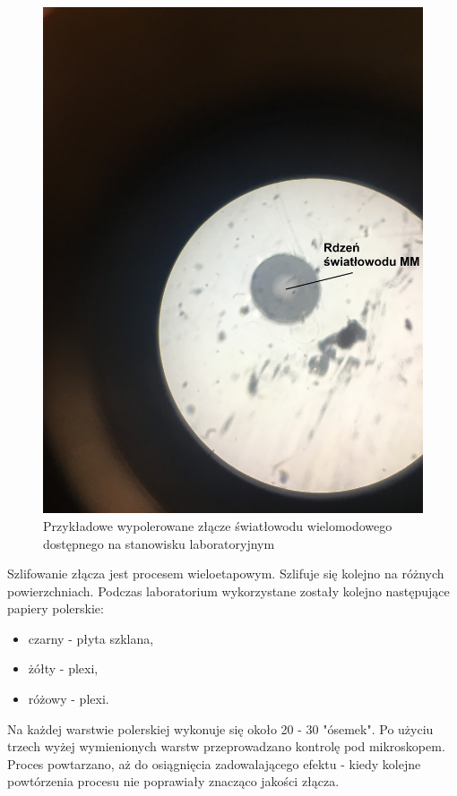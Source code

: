 \documentclass[12pt, a4paper, oneside]{article}
\begin{document}
\begin{figure}[t]
\centering
\caption{Przykładowe wypolerowane złącze światłowodu wielomodowego dostępnego na stanowisku laboratoryjnym}
\includegraphics[scale=0.1]{m4.jpg}
\end{figure}
\indent Szlifowanie złącza jest procesem wieloetapowym. Szlifuje się kolejno na różnych powierzchniach. Podczas laboratorium wykorzystane zostały kolejno następujące papiery polerskie:
\begin{itemize}
\item czarny - płyta szklana,
\item żółty - plexi,
\item różowy - plexi.
\end{itemize}
\indent\indent Na każdej warstwie polerskiej wykonuje się około 20 - 30 "ósemek". Po użyciu trzech wyżej wymienionych warstw przeprowadzano kontrolę pod mikroskopem. Proces powtarzano, aż do osiągnięcia zadowalającego efektu - kiedy kolejne powtórzenia procesu nie poprawiały znacząco jakości złącza.
\end{document}
